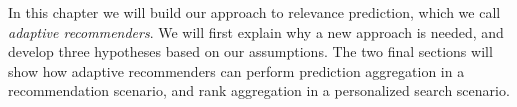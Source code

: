 \label{chap:methods}

In this chapter we will build our approach to relevance prediction, which we call \emph{adaptive recommenders}.
We will first explain why a new approach is needed, and develop three hypotheses based on our assumptions.
The two final sections will show how adaptive recommenders
can perform prediction aggregation in a recommendation scenario,
and rank aggregation in a personalized search scenario.








%
